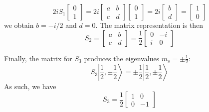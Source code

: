 \documentclass[../../../main.tex]{subfiles}
\begin{document}
\begin{equation*}
    2iS_1 \begin{bmatrix}
        0 \\
        1
    \end{bmatrix}  =
    2i
    \begin{bmatrix}
        a & b \\
        c & d
    \end{bmatrix}  \begin{bmatrix}
        0 \\
        1
    \end{bmatrix}  =
    2i
    \begin{bmatrix}
        b \\
        d
    \end{bmatrix}
    =
    \begin{bmatrix}
        1 \\
        0
    \end{bmatrix}
\end{equation*}
we obtain $b=-i/2$ and $d=0$.
The matrix representation is then
\begin{equation*}
    S_2 =
    \begin{bmatrix}
        a & b \\
        c & d
    \end{bmatrix}=
    \frac{1  }{2}
    \begin{bmatrix}
        0 & -i \\
        i & 0
    \end{bmatrix}
\end{equation*}

Finally, the matrix for $S_3$ produces the eigenvalues $m_s = \pm \frac{1}{2}$:
\begin{equation*}
    S_3 \left| \frac{1}{2}, \pm \frac{1}{2} \right\rangle = \pm \frac{1}{2} \left| \frac{1}{2}, \pm \frac{1}{2} \right\rangle
\end{equation*}
As such, we have
\begin{equation*}
    S_3 = \frac{1}{2} \begin{bmatrix}
        1 & 0  \\
        0 & -1
    \end{bmatrix}
\end{equation*}
\end{document}
